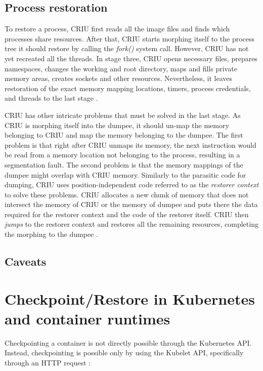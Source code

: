 \documentclass[
  digital,     %
  oneside,     %
  nosansbold,  %
  nocolorbold, %
  lof,         %
  lot,         %
]{fithesis4}
\begin{document}
\subsection{Process restoration}
To restore a process, CRIU first reads all the image files and finds which processes share resources. After that, CRIU starts morphing itself to the process tree it should restore by calling the \emph{fork()} system call. However, CRIU has not yet recreated all the threads. In stage three, CRIU opens necessary files, prepares namespaces, changes the working and root directory, maps and fills private memory areas, creates sockets and other resources. Nevertheless, it leaves restoration of the exact memory mapping locations, timers, process credentials, and threads to the last stage \cite{criu_cr}.

CRIU has other intricate problems that must be solved in the last stage. As CRIU is morphing itself into the dumpee, it should un-map the memory belonging to CRIU and map the memory belonging to the dumpee. The first problem is that right after CRIU unmaps its memory, the next instruction would be read from a memory location not belonging to the process, resulting in a segmentation fault. The second problem is that the memory mappings of the dumpee might overlap with CRIU memory. Similarly to the parasitic code for dumping, CRIU uses position-independent code referred to as the \emph{restorer context} to solve these problems. CRIU allocates a new chunk of memory that does not intersect the memory of CRIU or the memory of dumpee and puts there the data required for the restorer context and the code of the restorer itself. CRIU then \emph{jumps} to the restorer context and restores all the remaining resources, completing the morphing to the dumpee \cite{criu_restorer}.

\subsection{Caveats}

\section{Checkpoint/Restore in Kubernetes and container runtimes}
Checkpointing a container is not directly possible through the Kubernetes API. Instead, checkpointing is possible only by using the Kubelet API, specifically through an HTTP request \cite{k8s_kubelet_api}:
\end{document}
